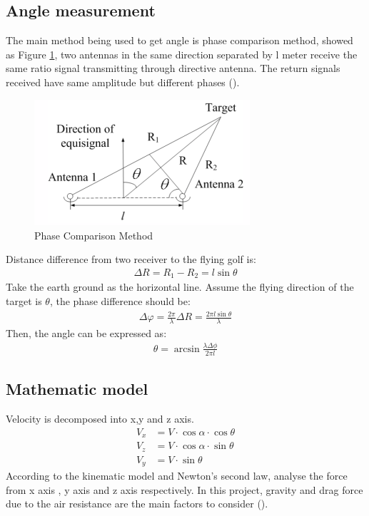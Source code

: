 \subsection{Angle measurement}
The main method being used to get angle is phase comparison method, showed as Figure \ref{fig:phase}, two antennas in the same direction separated by l meter receive the same ratio signal transmitting through directive antenna. The return signals received have same amplitude but different phases (\cite{li2015simulation}).
\begin{figure}[H]
    \centering
    \includegraphics[width=8cm]{figure/phase.png}
    \caption{Phase Comparison Method}
    \label{fig:phase}
\end{figure}
Distance difference from two receiver to the flying golf is:
\begin{align}
    \Delta R=R_{1}-R_{2}=l \sin \theta
\end{align}
Take the earth ground as the horizontal line. Assume the flying direction of the target is $\theta$, the phase difference should be:
\begin{align}
\Delta \varphi=\frac{2 \pi}{\lambda} \Delta R=\frac{2 \pi l \sin \theta}{\lambda}
\end{align}
Then, the angle can be expressed as:
\begin{align}
 \theta=\arcsin \frac{\lambda \Delta \phi}{2 \pi l}   
\end{align}

\subsection{Mathematic model}
Velocity is decomposed into x,y and z axis.
\begin{align}
    V_{x}&=V \cdot \cos \alpha \cdot \cos \theta\\
    V_{z}&=V \cdot \cos \alpha \cdot \sin \theta\\
    V_{y}&=V \cdot \sin \theta    
\end{align}
According to the kinematic model and Newton’s second law, analyse the force from x axis , y axis and z axis respectively. In this project, gravity and drag force due to the air resistance are the main factors to consider (\cite{AirResistanceModels}).\\

